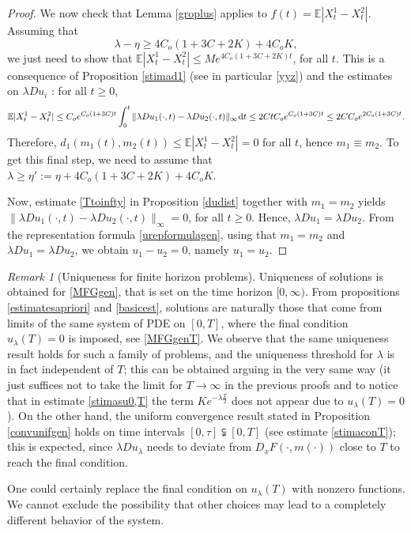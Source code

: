 \documentclass{amsart}
\theoremstyle{remark}
\newtheorem{rem}[thm]{Remark}
\theoremstyle{definition}
\theoremstyle{Claim}
\newcommand{\E}{\mathbb{E}}
\newcommand{\dd}{\hspace{0.7pt}{\rm d}}
\theoremstyle{plain}
\begin{document}
\begin{proof}
	
	We now check that Lemma \ref{groplus} applies to $f(t) = \E |X^1_t - X^2_t|$. Assuming that
	\[
	\lambda - \eta \ge {4C_o(1+3C+2K)+4C_oK} ,
	\]
	we just need to show that $ \E |X^1_t - X^2_t| \le M e^{ {4C_o(1+3C+2K)}t}$, for all $t$. This is a consequence of Proposition \ref{stimad1} (see in particular \eqref{yyz}) and the estimates on $\lambda Du_i$ : for all $t \ge 0$,
	\[
\E |X^1_t - X^2_t| \le C_oe^{ C_o(1+3C)t} \int_0^t  \| \lambda D u_1(\cdot,t) - \lambda D u_2(\cdot,t) \|_\infty \dd t \le 2Ct C_oe^{ C_o(1+3C)t}  \le 2CC_o e^{ 2C_o(1+3C)t}.
\]
	Therefore, $d_1(m_1(t), m_2(t)) \le \E |X^1_t - X^2_t| = 0$ for all $t$, hence $m_1 \equiv m_2$. To get this final step, we need to assume that $\lambda \ge \eta' := \eta + {4C_o(1+3C+2K)+4C_oK}$.
	\smallskip
	
		Now, estimate \eqref{Ttoinfty} in Proposition \ref{dudist} together with $m_1=m_2$ yields  $\|\lambda D u_1(\cdot,t) - \lambda D u_2(\cdot,t) \|_\infty =0$, for all $t\geq 0$. Hence, $\lambda Du_1=\lambda Du_2$. From the representation formula \eqref{urepformulagen}, using that $m_1=m_2$ and $\lambda Du_1=\lambda Du_2$, we obtain $u_1-u_2=0$, namely $u_1=u_2$.

	\end{proof}
	
	\begin{rem}[Uniqueness for finite horizon problems] Uniqueness of solutions is obtained for \eqref{MFGgen}, that is set on the time horizon $[0,\infty)$. From propositions \ref{estimatesapriori} and \ref{basicest}, solutions are naturally those that come from limits of the same system of PDE on $[0,T]$, where the final condition $u_\lambda(T) = 0$ is imposed, see \eqref{MFGgenT}. We observe that the same uniqueness result holds for such a family of problems, and the uniqueness threshold for $\lambda$ is in fact independent of $T$; this can be obtained arguing in the very same way (it just suffices not to take the limit for $T \to \infty$ in the previous proofs and to notice that in estimate \eqref{stimasu0,T} the term $Ke^{-\lambda \frac{T}{2}}$ does not appear due to $u_\lambda(T)=0$). On the other hand, the uniform convergence result stated in Proposition \ref{convunifgen} holds on time intervals $[0, \tau] \subsetneqq [0,T]$ (see estimate \eqref{stimaconT}); this is expected, since $\lambda Du_\lambda$ needs to deviate from $D_xF(\cdot,m(\cdot))$ close to $T$ to reach the final condition. 
	
	One could certainly replace the final condition on $u_\lambda(T)$ with nonzero functions. We cannot exclude the possibility that other choices may lead to a completely different behavior of the system.
	
	\end{rem}
\end{document}
